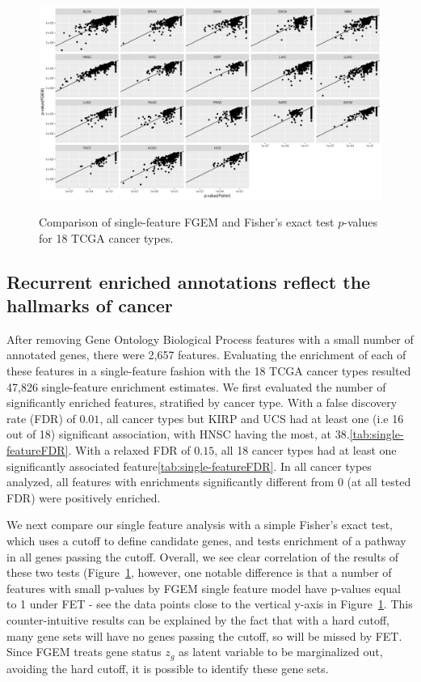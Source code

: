 \begin{figure}
\centering
\includegraphics[width=.9\linewidth]{img/fisher_vs_fgem.png}\label{fig:fisher_vs_fgem}
\caption{Comparison of single-feature FGEM and Fisher's exact test $p$-values for 18 TCGA cancer types.}
\end{figure}

\subsection{Recurrent enriched annotations reflect the hallmarks of cancer}\label{sec:orgd52f2ca}

After removing Gene Ontology Biological Process features with a small number of annotated genes, there were 2,657 features.  Evaluating the enrichment of each of these features in a single-feature fashion with the 18 TCGA cancer types resulted 47,826 single-feature enrichment estimates. We first evaluated the number of significantly enriched features, stratified by cancer type.  With a false discovery rate (FDR) of $0.01$, all cancer types but KIRP and UCS had at least one (i.e 16 out of 18) significant association, with HNSC having the most, at 38.\ref{tab:single-featureFDR}.  With a relaxed FDR of $0.15$, all 18 cancer types had at least one significantly associated feature\ref{tab:single-featureFDR}. In all cancer types analyzed, all features with enrichments significantly different from 0 (at all tested FDR) were positively enriched.  

We next compare our single feature analysis with a simple Fisher's exact test, which uses a cutoff to define candidate genes, and tests enrichment of a pathway in all genes passing the cutoff. Overall, we see clear correlation of the results of these two tests (Figure~\ref{fig:fisher_vs_fgem}, however, one notable difference is that a number of features with small p-values by FGEM single feature model have p-values equal to 1 under FET - see the data points close to the vertical y-axis in Figure~\ref{fig:fisher_vs_fgem}. This counter-intuitive results can be explained by the fact that with a hard cutoff, many gene sets will have no genes passing the cutoff, so will be missed by FET. Since FGEM treats gene status $z_g$ as latent variable to be marginalized out, avoiding the hard cutoff, it is possible to identify these gene sets. 

